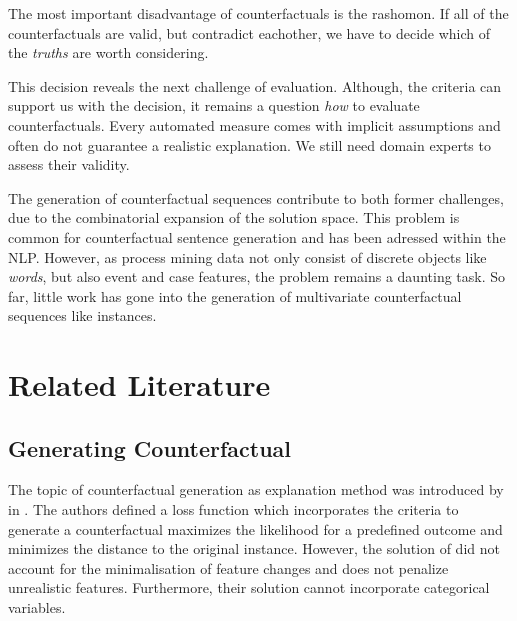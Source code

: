 \documentclass[12pt,a4paper]{report}
\begin{document}
The most important disadvantage of counterfactuals is the \gls{rashomon}\autocite[ch. 9.3]{molnar2019}. If all of the counterfactuals are valid, but contradict eachother, we have to decide which of the \emph{truths} are worth considering.

This decision reveals the next challenge of evaluation\needscite. Although, the criteria can support us with the decision, it remains a question \emph{how} to evaluate counterfactuals. Every automated measure comes with implicit assumptions and often do not guarantee a realistic explanation. We still need domain experts to assess their validity.

The generation of counterfactual sequences contribute to both former challenges, due to the combinatorial expansion of the solution space. This problem is common for counterfactual sentence generation and has been adressed within the \gls{NLP}\needscite. However, as process mining data not only consist of discrete objects like \emph{words}, but also event and case features, the problem remains a daunting task. So far, little work has gone into the generation of multivariate counterfactual sequences like \glspl{instance}\needscite.




\section{Related Literature}
\subsection{Generating Counterfactual}
The topic of counterfactual generation as explanation method was introduced by \citeauthor{wachter_CounterfactualExplanationsOpening_2017} in \citeyear{wachter_CounterfactualExplanationsOpening_2017}\needscite. The authors defined a loss function which incorporates the criteria to generate a counterfactual maximizes the likelihood for a predefined outcome and minimizes the distance to the original instance. However, the solution of \citeauthor{wachter_CounterfactualExplanationsOpening_2017} did not account for the minimalisation of feature changes and does not penalize unrealistic features. Furthermore, their solution cannot incorporate categorical variables.
\end{document}
